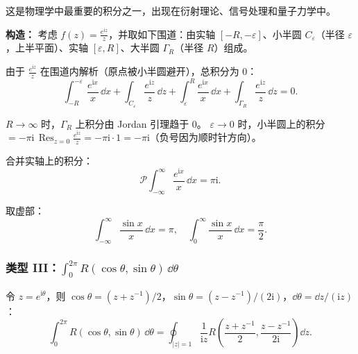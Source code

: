 \begin{example}[$\displaystyle\int_0^{\infty} \frac{\sin x}{x}\,\dd x = \frac{\pi}{2}$]
这是物理学中最重要的积分之一，出现在衍射理论、信号处理和量子力学中。

\textbf{构造：} 考虑 $f(z) = \frac{e^{\mathrm{i}z}}{z}$，并取如下围道：由实轴 $[-R,-\varepsilon]$、小半圆 $C_\varepsilon$（半径 $\varepsilon$，上半平面）、实轴 $[\varepsilon,R]$、大半圆 $\Gamma_R$（半径 $R$）组成。

由于 $\frac{e^{\mathrm{i}z}}{z}$ 在围道内解析（原点被小半圆避开），总积分为 $0$：
\begin{equation}
\int_{-R}^{-\varepsilon} \frac{e^{\mathrm{i}x}}{x}\,\dd x
+ \int_{C_\varepsilon} \frac{e^{\mathrm{i}z}}{z}\,\dd z
+ \int_{\varepsilon}^{R} \frac{e^{\mathrm{i}x}}{x}\,\dd x
+ \int_{\Gamma_R} \frac{e^{\mathrm{i}z}}{z}\,\dd z = 0.
\end{equation}

$R\to\infty$ 时，$\Gamma_R$ 上积分由 Jordan 引理趋于 $0$。
$\varepsilon\to0$ 时，小半圆上的积分 $= -\pi\mathrm{i}\,\mathop{\mathrm{Res}}_{z=0}\frac{e^{\mathrm{i}z}}{z} = -\pi\mathrm{i}\cdot 1 = -\pi\mathrm{i}$（负号因为顺时针方向）。

合并实轴上的积分：
\begin{equation}
\mathcal{P}\int_{-\infty}^{\infty} \frac{e^{\mathrm{i}x}}{x}\,\dd x = \pi\mathrm{i}.
\end{equation}

取虚部：
\begin{equation}
\int_{-\infty}^{\infty} \frac{\sin x}{x}\,\dd x = \pi,\quad
\int_{0}^{\infty} \frac{\sin x}{x}\,\dd x = \frac{\pi}{2}.
\end{equation}
\end{example}

\subsubsection{\texorpdfstring{类型 III：$\int_0^{2\pi} R(\cos\theta,\sin\theta)\,\dd\theta$}{类型 III：∫R(cosθ,sinθ)dθ}}

令 $z = e^{\mathrm{i}\theta}$，则 $\cos\theta = (z+z^{-1})/2$，$\sin\theta = (z-z^{-1})/(2\mathrm{i})$，$\dd\theta = \dd z/(\mathrm{i}z)$：
\begin{equation}
\int_0^{2\pi} R(\cos\theta,\sin\theta)\,\dd\theta
= \oint_{|z|=1} \frac{1}{\mathrm{i}z}R\left(\frac{z+z^{-1}}{2},
\frac{z-z^{-1}}{2\mathrm{i}}\right)\dd z.
\end{equation}

